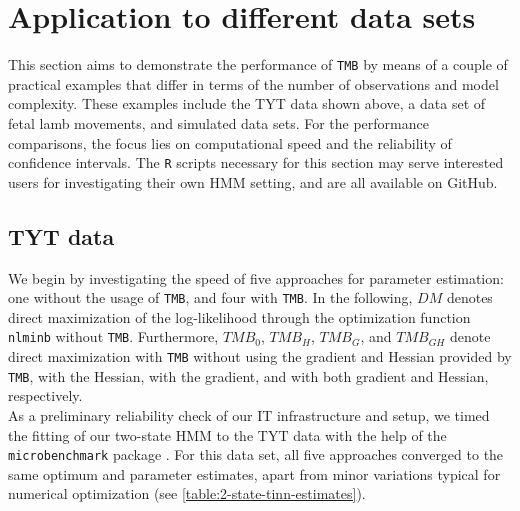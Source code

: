 \documentclass[bimj,fleqn]{w-art}\usepackage[]{graphicx}\usepackage[]{color}
\theoremstyle{plain}
\theoremstyle{definition}
\begin{document}
\section{Application to different data sets}
\label{sec:application_datasets}

This section aims to demonstrate the performance of \texttt{TMB} by means of a couple of practical examples that differ in terms of the number of observations and model complexity. These examples include the TYT data shown above, a data set of fetal lamb movements, and simulated data sets. For the performance comparisons, the focus lies on computational speed and the reliability of confidence intervals. The {\tt{R}} scripts necessary for this section may serve interested users for investigating their own HMM setting, and are all available on GitHub.



\subsection{TYT data}
\label{sec:tyt_data}

We begin by investigating the speed of five approaches for parameter estimation: one without the usage of {\tt{TMB}}, and four with {\tt{TMB}}. In the following, $DM$ denotes direct maximization of the log-likelihood through the optimization function \texttt{nlminb} without {\tt{TMB}}. Furthermore, $TMB_0$, $TMB_H$, $TMB_G$, and $TMB_{GH}$ denote direct maximization with {\tt{TMB}} without using the gradient and Hessian provided by {\tt{TMB}}, with the Hessian, with the gradient, and with both gradient and Hessian, respectively.\\
As a preliminary reliability check of our IT infrastructure and setup, we timed the fitting of our two-state HMM to the TYT data with the help of the {\tt{microbenchmark}} package \citep{mersmann}. For this data set, all five approaches converged to the same optimum and parameter estimates, apart from minor variations typical for numerical optimization (see \autoref{table:2-state-tinn-estimates}).

% 
\end{document}
